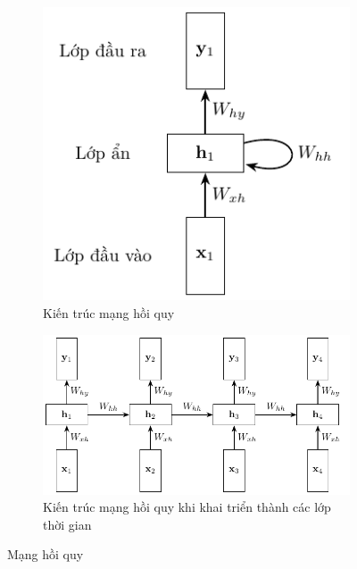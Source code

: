 \begin{figure}[htb]
    \centering
    \begin{subfigure}[b]{0.33\textwidth}
        \includegraphics[width=\textwidth]{tikz_image/rnn_loop_architecture.pdf}
        \caption{Kiến trúc mạng hồi quy}
        \label{figure:rnn-loop-architecture}
    \end{subfigure}
    \begin{subfigure}[b]{0.66\textwidth}
        \centering
        \includegraphics[width=\textwidth]{tikz_image/rnn_layer_architecture.pdf}
        \caption{Kiến trúc mạng hồi quy khi khai triển thành các lớp thời gian}
        \label{figure:rnn-layer-architecture}
    \end{subfigure}
    \caption[Mạng hồi quy]{Mạng hồi quy \cite{Aggarwal2023}}
\end{figure}
